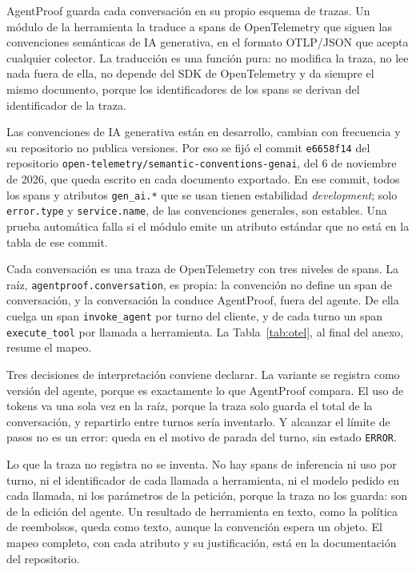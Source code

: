 \clearpage
\blank
{}
\begingroup\dobleesp
\vspace{6pt}
AgentProof guarda cada conversación en su propio esquema de trazas. Un módulo de la herramienta la traduce a spans de OpenTelemetry que siguen las convenciones semánticas de IA generativa, en el formato OTLP/JSON que acepta cualquier colector. La traducción es una función pura: no modifica la traza, no lee nada fuera de ella, no depende del SDK de OpenTelemetry y da siempre el mismo documento, porque los identificadores de los spans se derivan del identificador de la traza.
\par
Las convenciones de IA generativa están en desarrollo, cambian con frecuencia y su repositorio no publica versiones. Por eso se fijó el commit \texttt{e6658f14} del repositorio \texttt{open-telemetry/semantic-conventions-genai}, del 6 de noviembre de 2026, que queda escrito en cada documento exportado. En ese commit, todos los spans y atributos \texttt{gen\_ai.*} que se usan tienen estabilidad \emph{development}; solo \texttt{error.type} y \texttt{service.name}, de las convenciones generales, son estables. Una prueba automática falla si el módulo emite un atributo estándar que no está en la tabla de ese commit.
\par
Cada conversación es una traza de OpenTelemetry con tres niveles de spans. La raíz, \texttt{agentproof.conversation}, es propia: la convención no define un span de conversación, y la conversación la conduce AgentProof, fuera del agente. De ella cuelga un span \texttt{invoke\_agent} por turno del cliente, y de cada turno un span \texttt{execute\_tool} por llamada a herramienta. La Tabla~\ref{tab:otel}, al final del anexo, resume el mapeo.
\par

Tres decisiones de interpretación conviene declarar. La variante se registra como versión del agente, porque es exactamente lo que AgentProof compara. El uso de tokens va una sola vez en la raíz, porque la traza solo guarda el total de la conversación, y repartirlo entre turnos sería inventarlo. Y alcanzar el límite de pasos no es un error: queda en el motivo de parada del turno, sin estado \texttt{ERROR}.
\par
Lo que la traza no registra no se inventa. No hay spans de inferencia ni uso por turno, ni el identificador de cada llamada a herramienta, ni el modelo pedido en cada llamada, ni los parámetros de la petición, porque la traza no los guarda: son de la edición del agente. Un resultado de herramienta en texto, como la política de reembolsos, queda como texto, aunque la convención espera un objeto. El mapeo completo, con cada atributo y su justificación, está en la documentación del repositorio.
\par


